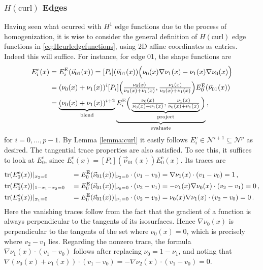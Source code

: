 \subsubsection{\texorpdfstring{$H(\mathrm{curl})$}{Hcurl} Edges}

Having seen what ocurred with $H^1$ edge functions due to the process of homogenization, it is wise to consider the general definition of $H(\mathrm{curl})$ edge functions in \eqref{eq:Hcurledgefunctions}, using 2D affine coordinates as entries. 
Indeed this will suffice.
For instance, for edge 01, the shape functions are
\begin{equation*}
	\begin{aligned}
		E_i^\mathrm{e}(x)&=E_i^{\mathrm{E}}(\vec{\nu}_{01}(x))=[P_i](\vec{\nu}_{01}(x))\Big(\nu_0(x)\nabla\nu_1(x)-\nu_1(x)\nabla\nu_0(x)\Big)\\
    	&=(\nu_0(x)+\nu_1(x))^i
    		[P_i]\Big(\textstyle{\frac{\nu_0(x)}{\nu_0(x)+\nu_1(x)}},\textstyle{\frac{\nu_1(x)}{\nu_0(x)+\nu_1(x)}}\Big)
    			E_0^{\mathrm{E}}(\vec{\nu}_{01}(x))\\
    	&=\underbrace{(\nu_0(x)+\nu_1(x))^{i+2}}_{\text{blend}}
    		\underbrace{E_i^{\mathrm{E}}\Big(\underbrace{\textstyle{\frac{\nu_0(x)}{\nu_0(x)+\nu_1(x)}},
    			\textstyle{\frac{\nu_1(x)}{\nu_0(x)+\nu_1(x)}}}_{\text{project}}\Big)}_{\text{evaluate}}\,,
	\end{aligned}
\end{equation*}
for $i=0,\ldots,p-1$. 
By Lemma \ref{lemma:curl} it easily follows $E_i^\mathrm{e}\in\mathcal{N}^{i+1}\subseteq\mathcal{N}^{p}$ as desired.
The tangential trace properties are also satisfied. 
To see this, it suffices to look at $E_0^\mathrm{e}$, since $E_i^\mathrm{e}(x)=[P_i](\vec{\nu}_{01}(x))E_0^\mathrm{e}(x)$. 
Its traces are
\begin{alignat*}{3}
    &\mathrm{tr}(E_0^\mathrm{e}(x))|_{x_2=0}&&=E_0^{\mathrm{E}}(\vec{\nu}_{01}(x))|_{\nu_2=0}\cdot(v_1-v_0)
    	=\nabla\nu_1(x)\cdot(v_1-v_0)=1\,,\\
    &\mathrm{tr}(E_0^\mathrm{e}(x))|_{1-x_1-x_2=0}&&=E_0^{\mathrm{E}}(\vec{\nu}_{01}(x))|_{\nu_0=0}\cdot(v_2-v_1)
    	=-\nu_1(x)\nabla\nu_0(x)\cdot(v_2-v_1)=0\,,\\
  	&\mathrm{tr}(E_0^\mathrm{e}(x))|_{x_1=0}&&=E_0^{\mathrm{E}}(\vec{\nu}_{01}(x))|_{\nu_1=0}\cdot(v_2-v_0)
  		=\nu_0(x)\nabla\nu_1(x)\cdot(v_2-v_0)=0\,.
\end{alignat*}
Here the vanishing traces follow from the fact that the gradient of a function is always perpendicular to the tangents of its isosurfaces. 
Hence $\nabla\nu_0(x)$ is perpendicular to the tangents of the set where $\nu_0(x)=0$, which is precisely where $v_2-v_1$ lies. 
Regarding the nonzero trace, the formula $\nabla\nu_1(x)\cdot(v_1-v_0)$ follows after replacing $\nu_0=1-\nu_1$, and noting that $\nabla(\nu_0(x)+\nu_1(x))\cdot(v_1-v_0)=-\nabla\nu_2(x)\cdot(v_1-v_0)=0$.

